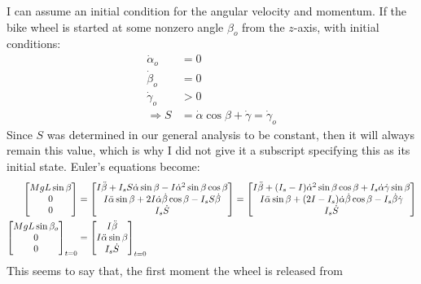 \documentclass[10pt]{article}
\begin{document}
I can assume an initial condition for the angular velocity and 
momentum. If the bike wheel is started at some nonzero angle 
$\beta_o$ from the $z$-axis, with initial conditions:
\begin{align*}
    \dot\alpha_o &=0 \\
    \dot\beta_o&=0 \\
    \dot\gamma_o &> 0 \\
    \Rightarrow S &= \dot\alpha\cos\beta + \dot\gamma = \dot\gamma_o
\end{align*}
Since $S$ was determined in our general analysis to be constant, then 
it will always remain this value, which is why I did not give it a subscript 
specifying this as its initial state. Euler's equations become:
\begin{align}
    \begin{bmatrix}
        MgL\sin\beta \\
        0 \\
        0 
    \end{bmatrix}
    &=
    \begin{bmatrix}
        I\ddot\beta +I_sS\dot\alpha\sin\beta 
            - I\dot\alpha^2\sin\beta\cos\beta \\
        I\ddot\alpha\sin\beta + 2I\dot\alpha\dot\beta\cos\beta 
            -I_sS\dot\beta \\
        I_s\dot S 
    \end{bmatrix}
    =
    \begin{bmatrix}
        I\ddot\beta +(I_s-I)\dot\alpha^2\sin\beta\cos\beta 
            +I_s\dot\alpha\dot\gamma\sin\beta \\
        I\ddot\alpha\sin\beta + (2I-I_s)\dot\alpha\dot\beta\cos\beta 
            -I_s\dot\beta\dot\gamma \\
        I_s\dot S 
    \end{bmatrix} \notag\\
    \begin{bmatrix}
        MgL\sin\beta_o \\
        0 \\
        0 
    \end{bmatrix}_{t=0}
    &=
    \begin{bmatrix}
        I\ddot\beta \\
        I\ddot\alpha\sin\beta \\
        I_s\dot S 
    \end{bmatrix}_{t=0}
\end{align}
This seems to say that, the first moment the wheel is released from 
\end{document}
